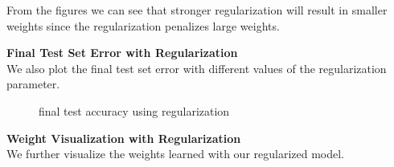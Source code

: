 \documentclass{article} %
\begin{document}
From the figures we can see that stronger regularization will result in smaller weights since the regularization penalizes large weights.

\textbf{Final Test Set Error with Regularization}\\
We also plot the final test set error with different values of the regularization parameter.

\begin{figure}%
	\centering
	\qquad
	\caption{final test accuracy using regularization}%
	\label{fig:P9}%
\end{figure}

\textbf{Weight Visualization with Regularization}\\
We further visualize the weights learned with our regularized model.
\end{document}
